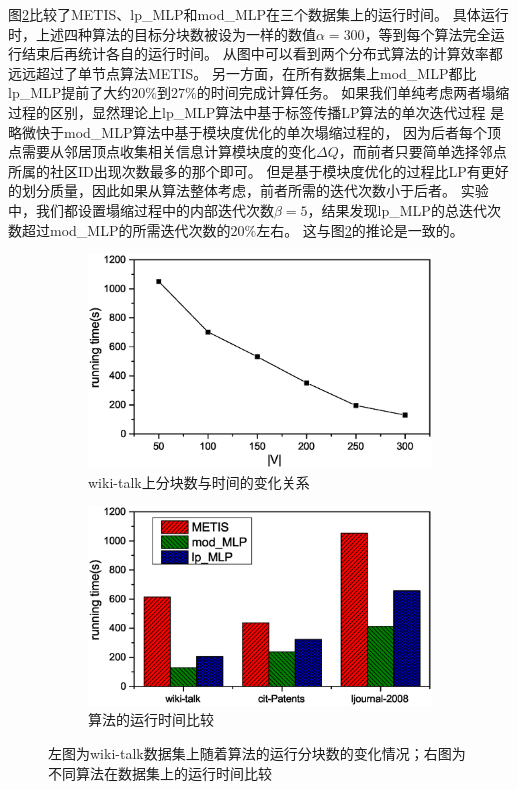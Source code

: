 \documentclass[master]{njuthesis}
\begin{document}
图\ref{fig:partition_time}比较了METIS、lp\string_MLP和mod\string_MLP在三个数据集上的运行时间。
具体运行时，上述四种算法的目标分块数被设为一样的数值$\alpha=300$，等到每个算法完全运行结束后再统计各自的运行时间。
从图中可以看到两个分布式算法的计算效率都远远超过了单节点算法METIS。
另一方面，在所有数据集上mod\string_MLP都比lp\string_MLP提前了大约$20\%$到$27\%$的时间完成计算任务。
如果我们单纯考虑两者塌缩过程的区别，显然理论上lp\string_MLP算法中基于标签传播LP算法的单次迭代过程
是略微快于mod\string_MLP算法中基于模块度优化的单次塌缩过程的，
因为后者每个顶点需要从邻居顶点收集相关信息计算模块度的变化$\Delta Q$，而前者只要简单选择邻点所属的社区ID出现次数最多的那个即可。
但是基于模块度优化的过程比LP有更好的划分质量，因此如果从算法整体考虑，前者所需的迭代次数小于后者。
实验中，我们都设置塌缩过程中的内部迭代次数$\beta=5$，结果发现lp\string_MLP的总迭代次数超过mod\string_MLP的所需迭代次数的$20\%$左右。
这与图\ref{fig:partition_time}的推论是一致的。

\begin{figure}[t]
\centering
\begin{subfigure}[b]{0.48\textwidth}
	\center
	\includegraphics[width=1\textwidth]{figure/block_time.eps}
	\caption{wiki-talk上分块数与时间的变化关系}
	\label{fig:block_with_time}
\end{subfigure}
\begin{subfigure}[b]{0.48\textwidth}
	\centering
	\includegraphics[width=1\textwidth]{figure/running_ti.eps}
	\caption{算法的运行时间比较}
	\label{fig:partition_time}
\end{subfigure}
\label{fig:running_cond}
\caption{左图为wiki-talk数据集上随着算法的运行分块数的变化情况；右图为不同算法在数据集上的运行时间比较}
\end{figure}
\end{document}
